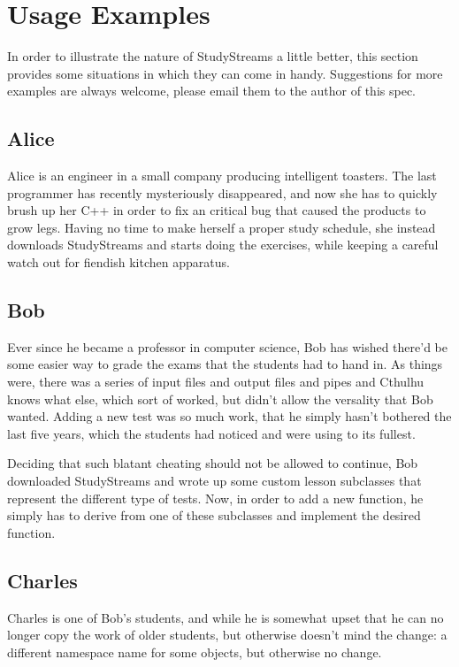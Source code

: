 \documentclass[12pt,a4paper]{report}
\begin{document}
	\chapter{Usage Examples}
		In order to illustrate the nature of StudyStreams a little better,
		this section provides some situations in which they can come in handy.
		Suggestions for more examples are always welcome, please email them to
		the author of this spec.

		\section{Alice}
			Alice is an engineer in a small company producing intelligent
			toasters.  The last programmer has recently mysteriously
			disappeared, and now she has to quickly brush up her C++ in
			order to fix an critical bug that caused the products to grow
			legs.  Having no time to make herself a proper study schedule,
			she instead downloads StudyStreams and starts doing the exercises,
			while keeping a careful watch out for fiendish kitchen apparatus.

		\section{Bob}
			Ever since he became a professor in computer science, Bob has wished
			there'd be some easier way to grade the exams that the students had
			to hand in.  As things were, there was a series of input files and
			output files and pipes and Cthulhu knows what else, which sort of
			worked, but didn't allow the versality that Bob wanted.  Adding a new
			test was so much work, that he simply hasn't bothered the last five
			years, which the students had noticed and were using to its fullest.

			Deciding that such blatant cheating should not be allowed to continue,
			Bob downloaded StudyStreams and wrote up some custom lesson subclasses
			that represent the different type of tests.  Now, in order to add a new
			function, he simply has to derive from one of these subclasses and
			implement the desired function.

		\section{Charles}
			Charles is one of Bob's students, and while he is somewhat upset that
			he can no longer copy the work of older students, but otherwise doesn't
			mind the change:  a different namespace name for some objects, but
			otherwise no change.
\end{document}
